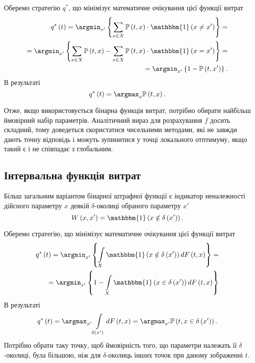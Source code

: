 Оберемо стратегію $q^*$,
що мінімізує математичне очікування цієї функції витрат
\begin{equation*}
  \begin{split}
    q^* \left( t \right)
    = \argmin_{x'} \left\{
      \sum\limits_{x \in X}
        \mathbb{P}\left( t, x \right)
        \cdot \mathbbm{1} \left( x \neq x' \right)
      \right\} = \\
    = \argmin_{x'} \left\{
      \sum\limits_{x \in X}
        \mathbb{P}\left( t, x \right)
      - \sum\limits_{x \in X}
        \mathbb{P}\left( t, x \right)
        \cdot \mathbbm{1} \left( x = x' \right)
      \right\} = \\
    = \argmin_{x'} \left\{
      1 - \mathbb{P}\left( t, x' \right)
      \right\}.
  \end{split}
\end{equation*}
В результаті
\begin{equation*}
  q^* \left( t \right)
  = \argmax_x \mathbb{P} \left( t, x \right).
\end{equation*}

Отже, якщо використовується бінарна функція витрат,
потрібно обирати найбільш ймовірний набір параметрів.
Аналітичний вираз для розрахування $f$ досить складний,
тому доведеться скористатися чисельними методами,
які не завжди дають точну відповідь
і можуть зупинитися у точці локального отптимуму, якщо такий є
і не співпадає з глобальним.

\subsection{Інтервальна функція витрат}

Більш загальним варіантом бінарної штрафної функції є
індикатор неналежності дійсного параметру $x$
деякій $\delta$-околиці обраного параметру $x'$
\begin{equation*}
  W \left( x, x' \right)
  = \mathbbm{1} \left( x \notin \delta\left( x' \right) \right).
\end{equation*}

Оберемо стратегію, що мінімізує математичне очікування цієї функції витрат
\begin{equation*}
  \begin{split}
    q^* \left( t \right)
    = \argmin_{x'} \left\{
      \int\limits_{X}
        \mathbbm{1} \left( x \notin \delta\left( x' \right) \right)
        d F\left( t, x \right)
      \right\} = \\
    = \argmin_{x'} \left\{
      1 -
      \int\limits_{X}
        \mathbbm{1} \left( x \in \delta\left( x' \right) \right)
        d F\left( t, x \right)
      \right\}
  \end{split}
\end{equation*}
В результаті
\begin{equation*}
  q^* \left( t \right)
  = \argmax_{x'} \int\limits_{\delta\left( x' \right)}
    dF\left( t, x \right)
  = \argmax_{x'} \mathbb{P} \left( t, x \in \delta\left( x' \right) \right).
\end{equation*}
Потрібно обрати таку точку,
щоб ймовірність того,
що параметри належать її $\delta$-околиці,
була більшою,
ніж для $\delta$-околиць інших точок при даному зображенні $t$.

